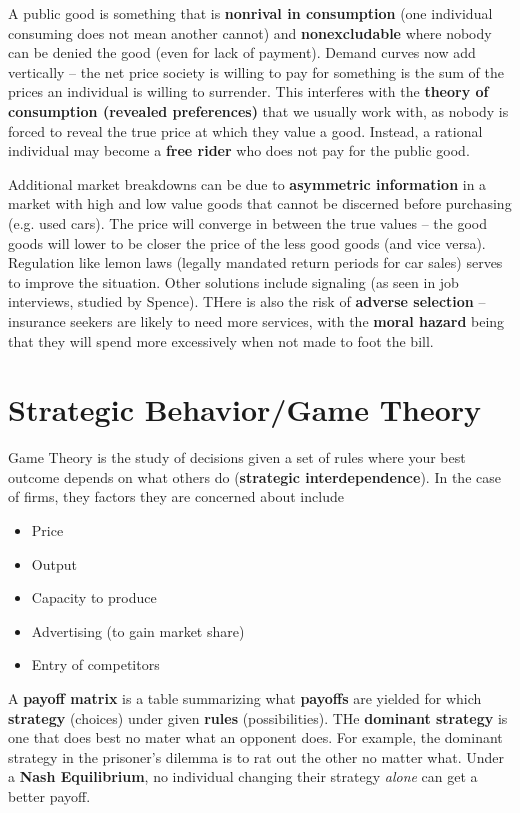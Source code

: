 \documentclass{article}
\begin{document}
A public good is something that is \textbf{nonrival in consumption} (one individual consuming does not mean another cannot) and \textbf{nonexcludable} where nobody can be denied the good (even for lack of payment). Demand curves now add vertically -- the net price society is willing to pay for something is the sum of the prices an individual is willing to surrender.
This interferes with the \textbf{theory of consumption (revealed preferences)} that we usually work with, as nobody is forced to reveal the true price at which they value a good. Instead, a rational individual may become a \textbf{free rider} who does not pay for the public good.

Additional market breakdowns can be due to \textbf{asymmetric information} in a market with high and low value goods that cannot be discerned before purchasing (e.g. used cars). The price will converge in between the true values -- the good goods will lower to be closer the price of the less good goods (and vice versa). Regulation like lemon laws (legally mandated return periods for car sales) serves to improve the situation. Other solutions include signaling (as seen in job interviews, studied by Spence). THere is also the risk of \textbf{adverse selection} -- insurance seekers are likely to need more services, with the \textbf{moral hazard} being that they will spend more excessively when not made to foot the bill.

\section{Strategic Behavior/Game Theory} \label{sec:gt}
Game Theory is the study of decisions given a set of rules where your best outcome depends on what others do (\textbf{strategic interdependence}). In the case of firms, they factors they are concerned about include
\begin{itemize}
	\item Price
	\item Output
	\item Capacity to produce
	\item Advertising (to gain market share)
	\item Entry of competitors
\end{itemize}
A \textbf{payoff matrix} is a table summarizing what \textbf{payoffs} are yielded for which \textbf{strategy} (choices) under given \textbf{rules} (possibilities). THe \textbf{dominant strategy} is one that does best no mater what an opponent does. For example, the dominant strategy in the prisoner's dilemma is to rat out the other no matter what. Under a \textbf{Nash Equilibrium}, no individual changing their strategy \textit{alone} can get a better payoff.
\end{document}
